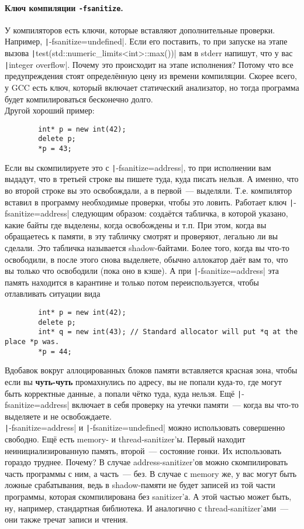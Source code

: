 \documentclass{article}
\begin{document}
    \paragraph{Ключ компиляции \texttt{-fsanitize}.}
    У компиляторов есть ключи, которые вставляют дополнительные проверки. Например, \texttt|-fsanitize=undefined|. Если его поставить, то при запуске на этапе вызова \texttt|test(std::numeric_limits<int>::max())| вам в stderr напишут, что у вас \texttt|integer overflow|. Почему это происходит на этапе исполнения? Потому что все предупреждения стоят определённую цену из времени компиляции. Скорее всего, у GCC есть ключ, который включает статический анализатор, но тогда программа будет компилироваться бесконечно долго.\\
    Другой хороший пример:
    \begin{verbatim}
        int* p = new int(42);
        delete p;
        *p = 43;
    \end{verbatim}
    Если вы скомпилируете это с \texttt|-fsanitize=address|, то при исполнении вам выдадут, что в третьей строке вы пишете туда, куда писать нельзя. А именно, что во второй строке вы это освобождали, а в первой~--- выделяли. Т.е. компилятор вставил в программу необходимые проверки, чтобы это ловить. Работает ключ \texttt|-fsanitize=address| следующим образом: создаётся табличка, в которой указано, какие байты где выделены, когда освобождены и т.п. При этом, когда вы обращаетесь к памяти, в эту табличку смотрят и проверяют, легально ли вы сделали. Это табличка называется shadow-байтами. Более того, когда вы что-то освободили, в после этого снова выделяете, обычно аллокатор даёт вам то, что вы только что освободили (пока оно в кэше). А при \texttt|-fsanitize=address| эта память находится в карантине и только потом переиспользуется, чтобы отлавливать ситуации вида
    \begin{verbatim}
        int* p = new int(42);
        delete p;
        int* q = new int(43); // Standard allocator will put *q at the place *p was.
        *p = 44;
    \end{verbatim}
    Вдобавок вокруг аллоцированных блоков памяти вставляется красная зона, чтобы если вы \textbf{чуть-чуть} промахнулись по адресу, вы не попали куда-то, где могут быть корректные данные, а попали чётко туда, куда нельзя. Ещё \texttt|-fsanitize=address| включает в себя проверку на утечки памяти~--- когда вы что-то выделяете и не освобождаете.\\
    \texttt|-fsanitize=address| и \texttt|-fsanitize=undefined| можно использовать совершенно свободно. Ещё есть memory- и thread-sanitizer'ы. Первый находит неинициализированную память, второй~--- состояние гонки. Их использовать гораздо труднее. Почему? В случае address-sanitizer'ов можно скомпилировать часть программы с ним, а часть~--- без. В случае с memory же, у вас могут быть ложные срабатывания, ведь в shadow-памяти не будет записей из той части программы, которая скомпилирована без sanitizer'а. А этой частью может быть, ну, например, стандартная библиотека. И аналогично с thread-sanitizer'ами~--- они также тречат записи и чтения.
\end{document}
